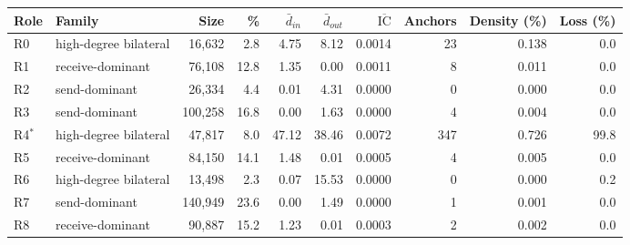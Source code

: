 \begin{tabular}{llrrrrrrrr}
\toprule
\textbf{Role} & \textbf{Family} & \textbf{Size} & \textbf{\%} & $\bar{d}_{in}$ & $\bar{d}_{out}$ & $\overline{\mathrm{IC}}$ & \textbf{Anchors} & \textbf{Density (\%)} & \textbf{Loss (\%)} \\
\midrule
R0 & high-degree bilateral & 16,632 & 2.8 & 4.75 & 8.12 & 0.0014 & 23 & 0.138 & 0.0 \\
R1 & receive-dominant & 76,108 & 12.8 & 1.35 & 0.00 & 0.0011 & 8 & 0.011 & 0.0 \\
R2 & send-dominant & 26,334 & 4.4 & 0.01 & 4.31 & 0.0000 & 0 & 0.000 & 0.0 \\
R3 & send-dominant & 100,258 & 16.8 & 0.00 & 1.63 & 0.0000 & 4 & 0.004 & 0.0 \\
R4$^*$ & high-degree bilateral & 47,817 & 8.0 & 47.12 & 38.46 & 0.0072 & 347 & 0.726 & 99.8 \\
R5 & receive-dominant & 84,150 & 14.1 & 1.48 & 0.01 & 0.0005 & 4 & 0.005 & 0.0 \\
R6 & high-degree bilateral & 13,498 & 2.3 & 0.07 & 15.53 & 0.0000 & 0 & 0.000 & 0.2 \\
R7 & send-dominant & 140,949 & 23.6 & 0.00 & 1.49 & 0.0000 & 1 & 0.001 & 0.0 \\
R8 & receive-dominant & 90,887 & 15.2 & 1.23 & 0.01 & 0.0003 & 2 & 0.002 & 0.0 \\
\bottomrule
\end{tabular}
